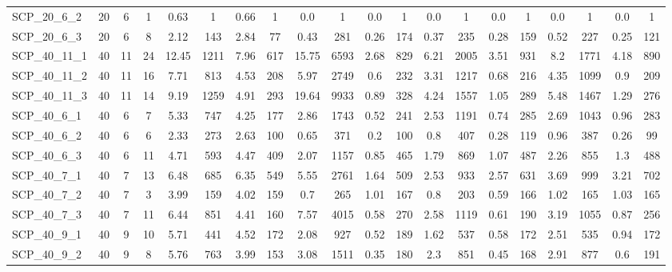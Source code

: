 \begin{sidewaystable}[!ht]
{\begin{tabular}{lccccccccccccccccccc}
SCP\_20\_6\_2 & 20 & 6 & 1 & 0.63 & 1 & 0.66 & 1 &  \textcolor{blue2}{0.0} & 1 &  \textcolor{blue2}{0.0} & 1 &  \textcolor{blue2}{0.0} & 1 &  \textcolor{blue2}{0.0} & 1 &  \textcolor{blue2}{0.0} & 1 &  \textcolor{blue2}{0.0} & 1 \\
SCP\_20\_6\_3 & 20 & 6 & 8 & 2.12 & 143 & 2.84 & 77 & 0.43 & 281 & 0.26 & 174 & 0.37 & 235 & 0.28 & 159 & 0.52 & 227 &  \textcolor{blue2}{0.25} & 121 \\
SCP\_40\_11\_1 & 40 & 11 & 24 & 12.45 & 1211 & 7.96 & 617 & 15.75 & 6593 &  \textcolor{blue2}{2.68} & 829 & 6.21 & 2005 & 3.51 & 931 & 8.2 & 1771 & 4.18 & 890 \\
SCP\_40\_11\_2 & 40 & 11 & 16 & 7.71 & 813 & 4.53 & 208 & 5.97 & 2749 &  \textcolor{blue2}{0.6} & 232 & 3.31 & 1217 & 0.68 & 216 & 4.35 & 1099 & 0.9 & 209 \\
SCP\_40\_11\_3 & 40 & 11 & 14 & 9.19 & 1259 & 4.91 & 293 & 19.64 & 9933 &  \textcolor{blue2}{0.89} & 328 & 4.24 & 1557 & 1.05 & 289 & 5.48 & 1467 & 1.29 & 276 \\
SCP\_40\_6\_1 & 40 & 6 & 7 & 5.33 & 747 & 4.25 & 177 & 2.86 & 1743 &  \textcolor{blue2}{0.52} & 241 & 2.53 & 1191 & 0.74 & 285 & 2.69 & 1043 & 0.96 & 283 \\
SCP\_40\_6\_2 & 40 & 6 & 6 & 2.33 & 273 & 2.63 & 100 & 0.65 & 371 &  \textcolor{blue2}{0.2} & 100 & 0.8 & 407 & 0.28 & 119 & 0.96 & 387 & 0.26 & 99 \\
SCP\_40\_6\_3 & 40 & 6 & 11 & 4.71 & 593 & 4.47 & 409 & 2.07 & 1157 &  \textcolor{blue2}{0.85} & 465 & 1.79 & 869 & 1.07 & 487 & 2.26 & 855 & 1.3 & 488 \\
SCP\_40\_7\_1 & 40 & 7 & 13 & 6.48 & 685 & 6.35 & 549 & 5.55 & 2761 &  \textcolor{blue2}{1.64} & 509 & 2.53 & 933 & 2.57 & 631 & 3.69 & 999 & 3.21 & 702 \\
SCP\_40\_7\_2 & 40 & 7 & 3 & 3.99 & 159 & 4.02 & 159 & 0.7 & 265 & 1.01 & 167 & 0.8 & 203 &  \textcolor{blue2}{0.59} & 166 & 1.02 & 165 & 1.03 & 165 \\
SCP\_40\_7\_3 & 40 & 7 & 11 & 6.44 & 851 & 4.41 & 160 & 7.57 & 4015 &  \textcolor{blue2}{0.58} & 270 & 2.58 & 1119 & 0.61 & 190 & 3.19 & 1055 & 0.87 & 256 \\
SCP\_40\_9\_1 & 40 & 9 & 10 & 5.71 & 441 & 4.52 & 172 & 2.08 & 927 &  \textcolor{blue2}{0.52} & 189 & 1.62 & 537 & 0.58 & 172 & 2.51 & 535 & 0.94 & 172 \\
SCP\_40\_9\_2 & 40 & 9 & 8 & 5.76 & 763 & 3.99 & 153 & 3.08 & 1511 &  \textcolor{blue2}{0.35} & 180 & 2.3 & 851 & 0.45 & 168 & 2.91 & 877 & 0.6 & 191 \\

\end{tabular}}
\end{sidewaystable}
